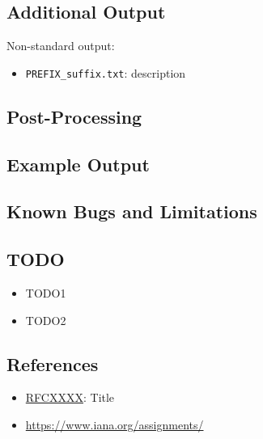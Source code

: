 \documentclass[documentation]{subfiles}
\begin{document}
\subsection{Additional Output}
Non-standard output:
\begin{itemize}
    \item {\tt PREFIX\_suffix.txt}: description
\end{itemize}

\subsection{Post-Processing}

\subsection{Example Output}

\subsection{Known Bugs and Limitations}

\subsection{TODO}
\begin{itemize}
    \item TODO1
    \item TODO2
\end{itemize}

\subsection{References}
\begin{itemize}
    \item \href{https://tools.ietf.org/html/rfcXXXX}{RFCXXXX}: Title
    \item \url{https://www.iana.org/assignments/}
\end{itemize}
\end{document}
